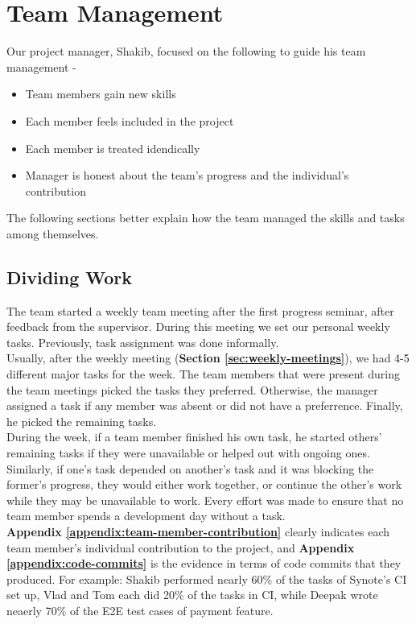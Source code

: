 \section{Team Management}
\label{sec:people-management}
Our project manager, Shakib, focused on the following to guide his team management \cite{iansommerville2011}-

\begin{itemize}

  \item Team members gain new skills
  \item Each member feels included in the project
  \item Each member is treated idendically
  \item Manager is honest about the team's progress and the individual's contribution

\end{itemize}

The following sections better explain how the team managed the skills and tasks among themselves.

\subsection{Dividing Work}
\label{subsec:dividing-work}
The team started a weekly team meeting after the first progress seminar, after feedback from the supervisor. During this meeting we set our personal weekly tasks. Previously, task assignment was done informally.\\

Usually, after the weekly meeting (\textbf{Section \ref{sec:weekly-meetings}}), we had 4-5 different major tasks for the week. The team members that were present during the team meetings picked the tasks they preferred. Otherwise, the manager assigned a task if any member was absent or did not have a preferrence. Finally, he picked the remaining tasks.\\

During the week, if a team member finished his own task, he started others' remaining tasks if they were unavailable or helped out with ongoing ones. Similarly, if one's task depended on another's task and it was blocking the former's progress, they would either work together, or continue the other's work while they may be unavailable to work. Every effort was made to ensure that no team member spends a development day without a task.\\

\textbf{Appendix \ref{appendix:team-member-contribution}} clearly indicates each team member's individual contribution to the project, and \textbf{Appendix \ref{appendix:code-commits}} is the evidence in terms of code commits that they  produced. For example: Shakib performed nearly 60\% of the tasks of Synote's CI set up, Vlad and Tom each did 20\% of the tasks in CI, while Deepak wrote neaerly 70\% of the E2E test cases of payment feature.\\

